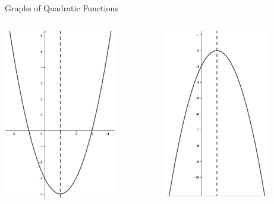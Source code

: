 \documentclass{beamer}
\begin{document}
\begin{frame}{Graphs of Quadratic Functions}
\begin{columns}
\begin{column}{0.5\textwidth}
\includegraphics[width=0.75\textwidth]{Quad1.png}
\end{column}
\begin{column}{0.5\textwidth}
\includegraphics[width=0.75\textwidth]{Quad2.png}

\end{column}
\end{columns}
\end{frame}
\end{document}
